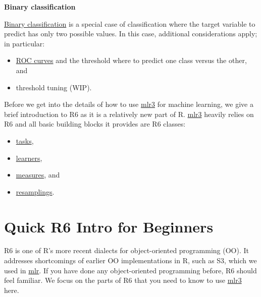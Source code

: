 \documentclass[]{scrbook}
\providecommand{\tightlist}{%
  \setlength{\itemsep}{0pt}\setlength{\parskip}{0pt}}
\begin{document}
\textbf{Binary classification}

\protect\hyperlink{binary-classification}{Binary classification} is a special case of classification where the target variable to predict has only two possible values.
In this case, additional considerations apply; in particular:

\begin{itemize}
\tightlist
\item
  \protect\hyperlink{binary-roc}{ROC curves} and the threshold where to predict one class versus the other, and
\item
  threshold tuning (WIP).
\end{itemize}

Before we get into the details of how to use \href{https://mlr3.mlr-org.com}{mlr3} for machine learning, we give a brief introduction to R6 as it is a relatively new part of R.
\href{https://mlr3.mlr-org.com}{mlr3} heavily relies on R6 and all basic building blocks it provides are R6 classes:

\begin{itemize}
\tightlist
\item
  \protect\hyperlink{tasks}{tasks},
\item
  \protect\hyperlink{learners}{learners},
\item
  \protect\hyperlink{measures}{measures}, and
\item
  \protect\hyperlink{resampling}{resamplings}.
\end{itemize}

\hypertarget{r6}{%
\section{Quick R6 Intro for Beginners}\label{r6}}

R6 is one of R's more recent dialects for object-oriented programming (OO).
It addresses shortcomings of earlier OO implementations in R, such as S3, which we used in \href{https://mlr.mlr-org.com}{mlr}.
If you have done any object-oriented programming before, R6 should feel familiar.
We focus on the parts of R6 that you need to know to use \href{https://mlr3.mlr-org.com}{mlr3} here.
\end{document}
